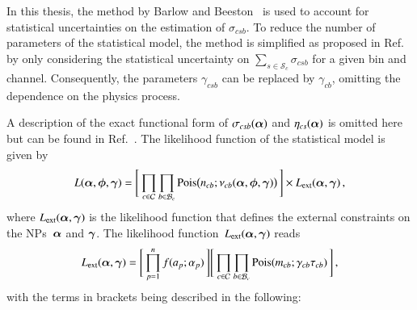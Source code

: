 \begin{itemize}
  In this thesis, the method by Barlow and Beeston~\cite{barlow1993} is used to
  account for statistical uncertainties on the estimation of $\sigma_{csb}$. To
  reduce the number of parameters of the statistical model, the method is
  simplified as proposed in Ref.~\cite{conway2011} by only considering the
  statistical uncertainty on $\sum_{s \in \mathcal{S}_{c}} \sigma_{csb}$ for a
  given bin and channel. Consequently, the parameters $\gamma_{csb}$ can be
  replaced by $\gamma_{cb}$, omitting the dependence on the physics process.

\end{itemize}
A description of the exact functional form of $\sigma_{csb}(\bm{\alpha})$ and
$\eta_{cs}(\bm{\alpha})$ is omitted here but can be found in
Ref.~\cite{cranmer2012}. The likelihood function of the statistical model is
given by
\begin{align}
  L(\bm{\alpha}, \bm{\phi}, \bm{\gamma}) = \Biggl[\,
  \prod_{c \in \mathcal{C}}
  \prod_{b \in \mathcal{B}_{c}}
  \operatorname{Pois}\bigl( n_{cb}; \nu_{cb}(\bm{\alpha}, \bm{\phi}, \bm{\gamma}) \bigr)
  \,\Biggr]
  \times L_{\text{ext}}(\bm{\alpha}, \bm{\gamma}) \,\text{,}
  \label{eq:likelihood_histfactory}
\end{align}
where $L_{\text{ext}}(\bm{\alpha}, \bm{\gamma})$ is the likelihood
function that defines the external constraints on the NPs~$\bm{\alpha}$ and
$\bm{\gamma}$. The likelihood
function~$L_{\text{ext}}(\bm{\alpha}, \bm{\gamma})$ reads
\begin{align}
  L_{\text{ext}}(\bm{\alpha}, \bm{\gamma}) =
  \Biggl[\, \prod_{p=1}^{n} f(a_p; \alpha_p)     \,\Biggr]
  \Biggl[\, \prod_{c \in \mathcal{C}} \prod_{b \in \mathcal{B}_{c}} \operatorname{Pois}(m_{cb}; \gamma_{cb} \tau_{cb}) \,\Biggr] \,\text{,}
  \label{eq:likelihood_histfactory_constraints}
\end{align}
with the terms in brackets being described in the following:
